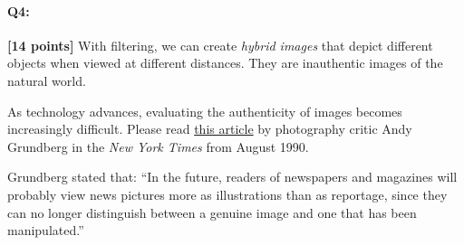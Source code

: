 \documentclass[11pt]{article}
\begin{document}
\pagebreak
\paragraph{Q4:} \textbf{[14 points]} With filtering, we can create \emph{hybrid images} that depict different objects when viewed at different distances. They are inauthentic images of the natural world.

As technology advances, evaluating the authenticity of images becomes increasingly difficult. Please read \href{https://www.nytimes.com/1990/08/12/arts/photography-view-ask-it-no-questions-the-camera-can-lie.html}{this article} by photography critic Andy Grundberg in the \emph{New York Times} from August 1990.

Grundberg stated that: ``In the future, readers of newspapers and magazines will probably view news pictures more as illustrations than as reportage, since they can no longer distinguish between a genuine image and one that has been manipulated.''
\end{document}
